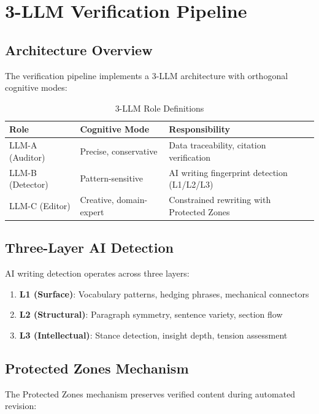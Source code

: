 \documentclass{article}
\begin{document}
\section{3-LLM Verification Pipeline}
\label{sec:pipeline}

\subsection{Architecture Overview}

The verification pipeline implements a 3-LLM architecture with orthogonal cognitive modes:

\begin{table}[h]
\centering
\begin{tabular}{lll}
\toprule
\textbf{Role} & \textbf{Cognitive Mode} & \textbf{Responsibility} \\
\midrule
LLM-A (Auditor) & Precise, conservative & Data traceability, citation verification \\
LLM-B (Detector) & Pattern-sensitive & AI writing fingerprint detection (L1/L2/L3) \\
LLM-C (Editor) & Creative, domain-expert & Constrained rewriting with Protected Zones \\
\bottomrule
\end{tabular}
\caption{3-LLM Role Definitions}
\label{tab:roles}
\end{table}

\subsection{Three-Layer AI Detection}

AI writing detection operates across three layers:

\begin{enumerate}
    \item \textbf{L1 (Surface)}: Vocabulary patterns, hedging phrases, mechanical connectors
    \item \textbf{L2 (Structural)}: Paragraph symmetry, sentence variety, section flow
    \item \textbf{L3 (Intellectual)}: Stance detection, insight depth, tension assessment
\end{enumerate}

\subsection{Protected Zones Mechanism}

The Protected Zones mechanism preserves verified content during automated revision:
\end{document}
